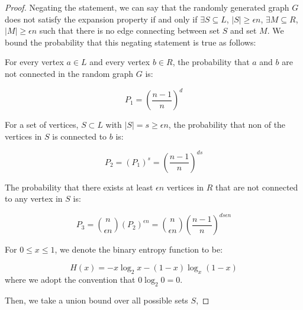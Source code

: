 \begin{proof}

Negating the statement, we can say that the randomly generated graph $G$ does not satisfy the expansion property if and only if $\exists S \subseteq L$, $|S| \ge \epsilon n$, $\exists M \subseteq R$, $|M| \ge  \epsilon n$ such that there is no edge connecting between set $S$ and set $M$. We bound the probability that this negating statement is true as follows:

For every vertex $a \in L$ and every vertex $b \in R$, the probability that $a$ and $b$ are not connected in the random graph $G$ is:

$$P_1 = (\frac{n-1}{n})^{d}$$

For a set of vertices, $S \subset L$ with $|S| = s \ge \epsilon n$, the probability that non of the vertices in $S$ is connected to $b$ is:

$$P_2 = (P_1)^s = (\frac{n-1}{n})^{d s}$$

The probability that there exists at least $\epsilon n$ vertices in $R$ that are not connected to any vertex in $S$ is:

$$P_3 = \binom{n}{\epsilon n} (P_2)^{\epsilon n} = \binom{n}{\epsilon n} (\frac{n-1}{n})^{d s \epsilon n}$$

For $0 \le x \le 1$, we denote the binary entropy function to be:

$$H(x) = -x\log_2 x - (1-x)\log_x (1-x)$$ 
where we adopt the convention that $0 \log_2 0 = 0$.

Then, we take a union bound over all possible sets $S$, 


\end{proof}
